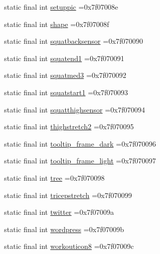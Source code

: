 \begin{DoxyCompactItemize}
\item 
static final int \mbox{\hyperlink{classcom_1_1example_1_1trainawearapplication_1_1_r_1_1drawable_a555da9d51b6aa486c1ebe3339a9c2aef}{setuppic}} =0x7f07008e
\item 
static final int \mbox{\hyperlink{classcom_1_1example_1_1trainawearapplication_1_1_r_1_1drawable_ae7f0de2b2e47502cd465d91cdcb48f5a}{shape}} =0x7f07008f
\item 
static final int \mbox{\hyperlink{classcom_1_1example_1_1trainawearapplication_1_1_r_1_1drawable_a80996dc47998cf8fc472d66e161fe9b5}{squatbacksensor}} =0x7f070090
\item 
static final int \mbox{\hyperlink{classcom_1_1example_1_1trainawearapplication_1_1_r_1_1drawable_a9099311d33fa787b9f07bbd02ec22fdc}{squatend1}} =0x7f070091
\item 
static final int \mbox{\hyperlink{classcom_1_1example_1_1trainawearapplication_1_1_r_1_1drawable_a1280ced02c44fbf5514341693d8fd46d}{squatmed3}} =0x7f070092
\item 
static final int \mbox{\hyperlink{classcom_1_1example_1_1trainawearapplication_1_1_r_1_1drawable_a0f56f97e089e6af2191cdc487b190ef3}{squatstart1}} =0x7f070093
\item 
static final int \mbox{\hyperlink{classcom_1_1example_1_1trainawearapplication_1_1_r_1_1drawable_a00485a423e130e0bb31caf775645c615}{squatthighsensor}} =0x7f070094
\item 
static final int \mbox{\hyperlink{classcom_1_1example_1_1trainawearapplication_1_1_r_1_1drawable_a723a3b1a096eb6df3bc09202912bc93e}{thighstretch2}} =0x7f070095
\item 
static final int \mbox{\hyperlink{classcom_1_1example_1_1trainawearapplication_1_1_r_1_1drawable_ac6219fedaf985c66f1a299eb32d06895}{tooltip\+\_\+frame\+\_\+dark}} =0x7f070096
\item 
static final int \mbox{\hyperlink{classcom_1_1example_1_1trainawearapplication_1_1_r_1_1drawable_a5fcc60dbb7d735ec51fc9bb9d39beefd}{tooltip\+\_\+frame\+\_\+light}} =0x7f070097
\item 
static final int \mbox{\hyperlink{classcom_1_1example_1_1trainawearapplication_1_1_r_1_1drawable_afdf7969b578835611a1be4280657ac3e}{tree}} =0x7f070098
\item 
static final int \mbox{\hyperlink{classcom_1_1example_1_1trainawearapplication_1_1_r_1_1drawable_a9d7b82ccccc5250d7dbe138e1d847501}{tricepstretch}} =0x7f070099
\item 
static final int \mbox{\hyperlink{classcom_1_1example_1_1trainawearapplication_1_1_r_1_1drawable_aac627ec4c4ea186d1b3a96de70677e59}{twitter}} =0x7f07009a
\item 
static final int \mbox{\hyperlink{classcom_1_1example_1_1trainawearapplication_1_1_r_1_1drawable_afb375044680afda4aaac07bcd37d2ec6}{wordpress}} =0x7f07009b
\item 
static final int \mbox{\hyperlink{classcom_1_1example_1_1trainawearapplication_1_1_r_1_1drawable_af5392e26a2460e42f5b2b8bf22cba82d}{workouticon8}} =0x7f07009c
\end{DoxyCompactItemize}


